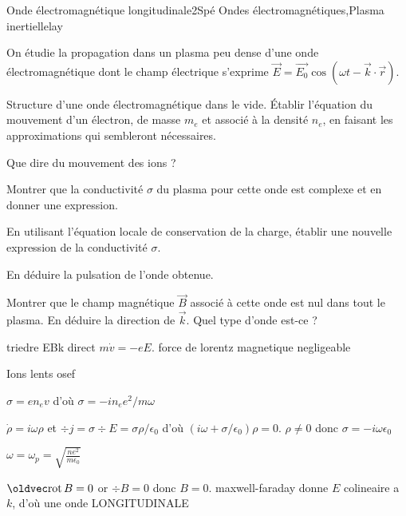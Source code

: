 \begin{exercise}{Onde électromagnétique longitudinale}{2}{Spé}
{Ondes électromagnétiques,Plasma inertiel}{lelay}

On étudie la propagation dans un plasma peu dense d'une onde électromagnétique dont le champ électrique s'exprime $\vec{E} = \vec{E_0}\cos(\omega t - \vec{k}\cdot\vec{r})$.
\begin{questions}
    \questioncours Structure d'une onde électromagnétique dans le vide.
    \question Établir l'équation du mouvement d'un électron, de masse $m_e$ et associé à la densité $n_e$, en faisant les approximations qui sembleront nécessaires.

    \question Que dire du mouvement des ions ?
    
    \question Montrer que la conductivité $\sigma$ du plasma pour cette onde est complexe et en donner une expression.

    
    \question En utilisant l'équation locale de conservation de la charge, établir une nouvelle expression de la conductivité $\sigma$.
    
    \question En déduire la pulsation de l'onde obtenue.
    
    \question Montrer que le champ magnétique $\vec{B}$ associé à cette onde est nul dans tout le plasma. En déduire la direction de $\vec{k}$. Quel type d'onde est-ce ?
\end{questions}

\end{exercise}

\begin{solution}

\begin{questions}
    \questioncours triedre EBk direct
    \question $m \dot{v} = -e E$. force de lorentz magnetique negligeable

    \question Ions lents osef
    
    \question $\sigma = e n_e v$ d'où $\sigma = -in_e e^2/m\omega$

    
    \question $\dot \rho = i\omega \rho$ et $\div j = \sigma \div E = \sigma \rho/\epsilon_0$ d'où $(i\omega + \sigma/\epsilon_0)\rho = 0$. $\rho \neq 0$ donc $\sigma = -i\omega \epsilon_0$
    
    \question $\omega = \omega_p = \sqrt{\frac{ne^2}{m\epsilon_0}}$
    
    \question $\rot B = 0$ or $\div B = 0$ donc $B = 0$. maxwell-faraday donne $E$ colineaire a $k$, d'où une onde LONGITUDINALE
\end{questions}
\end{solution}